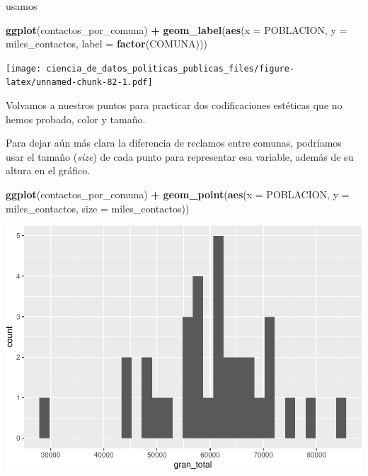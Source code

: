 \documentclass[]{book}
\newenvironment{Shaded}{\begin{snugshade}}{\end{snugshade}}
\newcommand{\KeywordTok}[1]{\textcolor[rgb]{0.13,0.29,0.53}{\textbf{#1}}}
\newcommand{\DataTypeTok}[1]{\textcolor[rgb]{0.13,0.29,0.53}{#1}}
\newcommand{\StringTok}[1]{\textcolor[rgb]{0.31,0.60,0.02}{#1}}
\newcommand{\OperatorTok}[1]{\textcolor[rgb]{0.81,0.36,0.00}{\textbf{#1}}}
\newcommand{\NormalTok}[1]{#1}
\begin{document}
usamos

\begin{Shaded}
\begin{Highlighting}[]
\KeywordTok{ggplot}\NormalTok{(contactos_por_comuna) }\OperatorTok{+}
\StringTok{    }\KeywordTok{geom_label}\NormalTok{(}\KeywordTok{aes}\NormalTok{(}\DataTypeTok{x =}\NormalTok{ POBLACION, }\DataTypeTok{y =}\NormalTok{ miles_contactos, }\DataTypeTok{label =} \KeywordTok{factor}\NormalTok{(COMUNA)))}
\end{Highlighting}
\end{Shaded}

\texttt{[image: ciencia\_de\_datos\_politicas\_publicas\_files/figure-latex/unnamed-chunk-82-1.pdf]}

Volvamos a nuestros puntos para practicar dos codificaciones estéticas
que no hemos probado, color y tamaño.

Para dejar aún más clara la diferencia de reclamos entre comunas,
podríamos usar el tamaño (\emph{size}) de cada punto para representar
esa variable, además de su altura en el gráfico.

\begin{Shaded}
\begin{Highlighting}[]
\KeywordTok{ggplot}\NormalTok{(contactos_por_comuna) }\OperatorTok{+}\StringTok{ }
\StringTok{    }\KeywordTok{geom_point}\NormalTok{(}\KeywordTok{aes}\NormalTok{(}\DataTypeTok{x =}\NormalTok{ POBLACION, }\DataTypeTok{y =}\NormalTok{ miles_contactos, }\DataTypeTok{size =}\NormalTok{ miles_contactos))}
\end{Highlighting}
\end{Shaded}

\includegraphics{ciencia_de_datos_politicas_publicas_files/figure-latex/unnamed-chunk-83-1.pdf}
\end{document}

